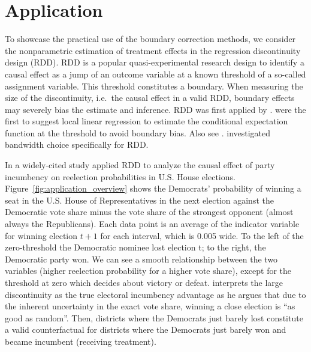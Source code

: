 


\section{Application} \label{sec:application}

To showcase the practical use of the boundary correction methods,
we consider the nonparametric estimation of treatment effects in the regression discontinuity design (RDD).
RDD is a popular quasi-experimental research design to identify a causal effect as a jump of an outcome variable
at a known threshold of a so-called assignment variable.
This threshold constitutes a boundary.
When measuring the size of the discontinuity, i.e.\ the causal effect in a valid RDD,
boundary effects may severely bias the estimate and inference.
RDD was first applied by \textcite{Thistlethwaite_1960}.
\textcite{Hahn_2001} were the first to suggest local linear regression to estimate the conditional expectation function
at the threshold to avoid boundary bias.
Also see \textcite{Porter_2003}.
\textcite{Imbens_2012} investigated bandwidth choice specifically for RDD. 

In a widely-cited study \textcite{Lee_2008} applied RDD to analyze the causal effect of party incumbency on reelection probabilities in U.S. House elections.
Figure~\ref{fig:application_overview} shows the Democrats' probability of winning a seat in the U.S. House of Representatives in the next election against the Democratic vote share minus the vote share of the strongest opponent (almost always the Republicans).
Each data point is an average of the indicator variable for winning election $t+1$ for each interval, which is 0.005 wide.
To the left of the zero-threshold the Democratic nominee lost election t;
to the right, the Democratic party won.
We can see a smooth relationship between the two variables (higher reelection probability for a higher vote share),
except for the threshold at zero which decides about victory or defeat.
\textcite{Lee_2008} interprets the large discontinuity as the true electoral incumbency advantage
as he argues that due to the inherent uncertainty in the exact vote share, winning a close election is \enquote{as good as random}.
Then, districts where the Democrats just barely lost constitute a valid counterfactual for districts where the Democrats just barely won and became incumbent (receiving treatment).

